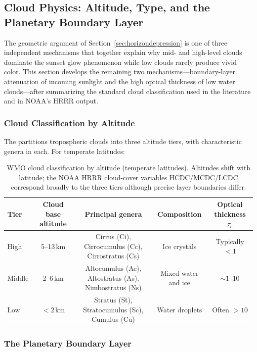 \documentclass[11pt,a4paper]{article}
\begin{document}
\subsection{Cloud Physics: Altitude, Type, and the Planetary Boundary Layer}

The geometric argument of Section~\ref{sec:horizondepression} is one of three independent mechanisms that together explain why mid- and high-level clouds dominate the sunset glow phenomenon while low clouds rarely produce vivid color. This section develops the remaining two mechanisms---boundary-layer attenuation of incoming sunlight and the high optical thickness of low water clouds---after summarizing the standard cloud classification used in the literature and in NOAA's HRRR output.

\subsubsection{Cloud Classification by Altitude}

The \citet{wmo_cloud_atlas} partitions tropospheric clouds into three altitude tiers, with characteristic genera in each. For temperate latitudes:

\begin{table}[H]
\centering
\small
\begin{tabular}{lcccc}
\toprule
Tier & Cloud base altitude & Principal genera & Composition & Optical thickness $\tau_c$ \\
\midrule
High & 5--13\,km & Cirrus (Ci), Cirrocumulus (Cc), Cirrostratus (Cs) & Ice crystals & Typically $< 1$ \\
Middle & 2--6\,km & Altocumulus (Ac), Altostratus (As), Nimbostratus (Ns) & Mixed water and ice & $\sim 1$--$10$ \\
Low & $< 2$\,km & Stratus (St), Stratocumulus (Sc), Cumulus (Cu) & Water droplets & Often $> 10$ \\
\bottomrule
\end{tabular}
\caption{WMO cloud classification by altitude (temperate latitudes). Altitudes shift with latitude; the NOAA HRRR cloud-cover variables HCDC/MCDC/LCDC correspond broadly to the three tiers although precise layer boundaries differ.}
\label{tab:wmo}
\end{table}

\subsubsection{The Planetary Boundary Layer}
\end{document}
